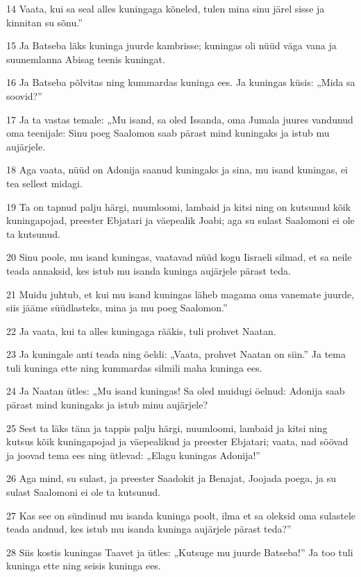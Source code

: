 \par 14 Vaata, kui sa seal alles kuningaga kõneled, tulen mina sinu järel sisse ja kinnitan su sõnu.”
\par 15 Ja Batseba läks kuninga juurde kambrisse; kuningas oli nüüd väga vana ja suunemlanna Abisag teenis kuningat.
\par 16 Ja Batseba põlvitas ning kummardas kuninga ees. Ja kuningas küsis: „Mida sa soovid?”
\par 17 Ja ta vastas temale: „Mu isand, sa oled Issanda, oma Jumala juures vandunud oma teenijale: Sinu poeg Saalomon saab pärast mind kuningaks ja istub mu aujärjele.
\par 18 Aga vaata, nüüd on Adonija saanud kuningaks ja sina, mu isand kuningas, ei tea sellest midagi.
\par 19 Ta on tapnud palju härgi, nuumloomi, lambaid ja kitsi ning on kutsunud kõik kuningapojad, preester Ebjatari ja väepealik Joabi; aga su sulast Saalomoni ei ole ta kutsunud.
\par 20 Sinu poole, mu isand kuningas, vaatavad nüüd kogu Iisraeli silmad, et sa neile teada annaksid, kes istub mu isanda kuninga aujärjele pärast teda.
\par 21 Muidu juhtub, et kui mu isand kuningas läheb magama oma vanemate juurde, siis jääme süüdlasteks, mina ja mu poeg Saalomon.”
\par 22 Ja vaata, kui ta alles kuningaga rääkis, tuli prohvet Naatan.
\par 23 Ja kuningale anti teada ning öeldi: „Vaata, prohvet Naatan on siin.” Ja tema tuli kuninga ette ning kummardas silmili maha kuninga ees.
\par 24 Ja Naatan ütles: „Mu isand kuningas! Sa oled muidugi öelnud: Adonija saab pärast mind kuningaks ja istub minu aujärjele?
\par 25 Sest ta läks täna ja tappis palju härgi, nuumloomi, lambaid ja kitsi ning kutsus kõik kuningapojad ja väepealikud ja preester Ebjatari; vaata, nad söövad ja joovad tema ees ning ütlevad: „Elagu kuningas Adonija!”
\par 26 Aga mind, su sulast, ja preester Saadokit ja Benajat, Joojada poega, ja su sulast Saalomoni ei ole ta kutsunud.
\par 27 Kas see on sündinud mu isanda kuninga poolt, ilma et sa oleksid oma sulastele teada andnud, kes istub mu isanda kuninga aujärjele pärast teda?”
\par 28 Siis kostis kuningas Taavet ja ütles: „Kutsuge mu juurde Batseba!” Ja too tuli kuninga ette ning seisis kuninga ees.
